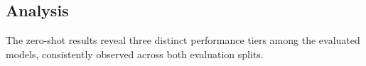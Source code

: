\documentclass[12pt,a4paper]{report}
\begin{document}
\subsection{Analysis}

The zero-shot results reveal three distinct performance tiers among the evaluated models,
consistently observed across both evaluation splits.
\end{document}
